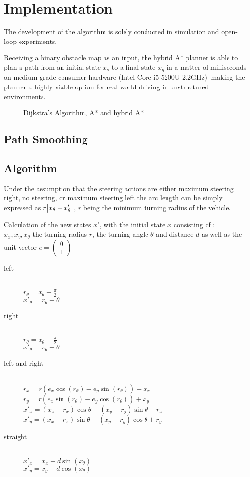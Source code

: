 \chapter{Implementation}
The development of the algorithm is solely conducted in simulation and open-loop experiments.

Receiving a binary obstacle map as an input, the hybrid A* planner is able to plan a path from an initial state $x_s$ to a final state $x_g$ in a matter of milliseconds on medium grade consumer hardware (Intel Core i5-5200U 2.2GHz), making the planner a highly viable option for real world driving in unstructured environments.

\begin{figure}[h]
    \caption{Dijkstra's Algorithm, A* and hybrid A*}
    \label{fig:searchComparison}
\end{figure}

\section{Path Smoothing}

\section{Algorithm}

Under the assumption that the steering actions are either maximum steering right, no steering, or maximum steering left the arc length can be simply expressed as $r\abs{x_\theta- x'_\theta}$, $r$ being the minimum turning radius of the vehicle. 

Calculation of the new states $x'$, with the initial state $x$ consisting of :\\
$x_x, x_y, x_\theta$ the turning radius $r$, the turning angle $\theta$ and distance $d$ as well as the unit vector $e = \left(\begin{smallmatrix}0\\1\end{smallmatrix}\right)$
\begin{description}
  \item[left] \hfill \\
  $r_\theta = x_\theta + \frac{\pi}{2}$\\
  $x'_\theta = x_\theta + \theta$
  \item[right] \hfill \\
  $r_\theta = x_\theta - \frac{\pi}{2}$\\
  $x'_\theta = x_\theta - \theta$
  \item[left and right] \hfill\\
  $r_x = r(e_x\cos(r_\theta) - e_y\sin(r_\theta)) + x_x$\\
  $r_y = r(e_x\sin(r_\theta) - e_y\cos(r_\theta)) + x_y$\\
  $x'_x = (x_x-r_x)\cos\theta - (x_y-r_y)\sin\theta + r_x$\\
  $x'_y = (x_x-r_x)\sin\theta - (x_y-r_y)\cos\theta + r_y$
  \item[straight] \hfill \\
  $x'_x = x_x - d\sin(x_\theta)$\\
  $x'_y = x_y + d\cos(x_\theta)$
\end{description}